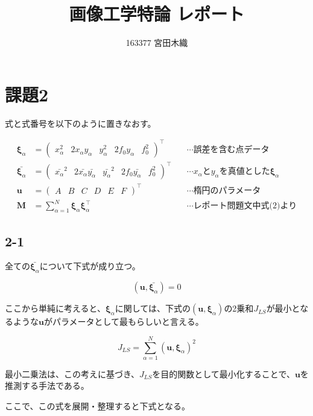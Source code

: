 \documentclass[12pt,a4j]{jsarticle}
\title{画像工学特論 レポート}
\author{163377 宮田木織}
\newcommand{\xa}{x_\alpha}
\newcommand{\ya}{y_\alpha}
\newcommand{\xia}{\bm{\xi}_\alpha}
\begin{document}
  \maketitle %

\section*{課題2}
  式と式番号を以下のように置きなおす。

  \begin{align}
    \xia &= \begin{pmatrix}\xa^2 & 2\xa\ya & \ya^2 & 2f_0\ya & f_0^2\end{pmatrix}^\top
     & \quad\cdots\text{誤差を含む点データ} \\
    \bar{\xia} &= \begin{pmatrix}\bar{\xa}^2 & 2\bar{\xa}\bar{\ya} & \bar{\ya}^2 & 2f_0\bar{\ya} & f_0^2\end{pmatrix}^\top
     & \quad\cdots\text{$\xa$と$\ya$を真値とした$\xia$} \\
    \bm{u} &= \begin{pmatrix}A & B & C & D & E & F\end{pmatrix}^\top
     & \quad\cdots\text{楕円のパラメータ} \\
    \bm{M} &= \sum_{\alpha = 1}^N \xia \xia^\top
     & \quad\cdots\text{レポート問題文中式(2)より} \label{eq:M}
  \end{align}

  \subsection*{2-1}

  全ての$\bar{\xia}$について下式が成り立つ。

  \begin{equation}
    (\bm{u}, \bar{\xia}) = 0
  \end{equation}

  ここから単純に考えると、$\xia$に関しては、下式の$(\bm{u}, \xia)$の2乗和$J_{LS}$が最小となるような$\bm{u}$がパラメータとして最もらしいと言える。

  \begin{equation}
    J_{LS} = \sum_{\alpha = 1}^N (\bm{u}, \xia)^2
  \end{equation}

  最小二乗法は、この考えに基づき、$J_{LS}$を目的関数として最小化することで、$\bm{u}$を推測する手法である。\par
  ここで、この式を展開・整理すると下式となる。
\end{document}
